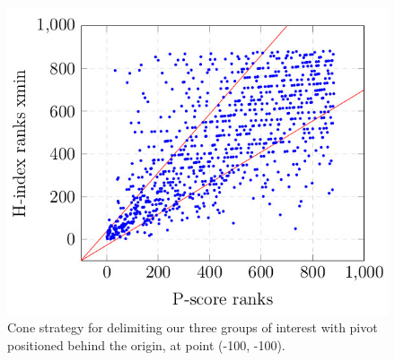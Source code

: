 \documentclass[man]{apa6}
\begin{document}
\begin{figure}[h!]
  \begin{center}
    \centerline{\includegraphics[scale=0.4]{pivot_strategy}}

    \caption{Cone strategy for delimiting our three groups of interest with pivot positioned behind the origin, at point (-100, -100).}
    \label{fig:cone_strategy_adapted}
  \end{center}
\end{figure}
\end{document}
